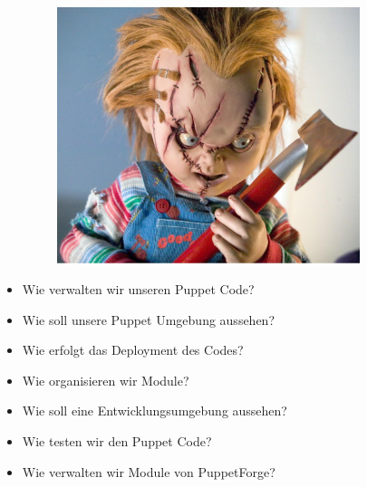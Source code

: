 \documentclass{beamer}
\begin{document}
\begin{frame}
\end{frame}

\begin{frame}
  \begin{figure}[ht]
    \centering
      \includegraphics[height=7.5cm,width=10cm]{../pics/chucky.png}
    \label{fig:stack}
  \end{figure}
\end{frame}


\begin{frame}
  \begin{itemize}
  \item Wie verwalten wir unseren Puppet Code?
  \item Wie soll unsere Puppet Umgebung aussehen?
  \item Wie erfolgt das Deployment des Codes?
  \item Wie organisieren wir Module?
  \item Wie soll eine Entwicklungsumgebung aussehen?
  \item Wie testen wir den Puppet Code?
  \item Wie verwalten wir Module von PuppetForge?
  \end{itemize}
\end{frame}

\begin{frame}
\end{frame}
\end{document}
